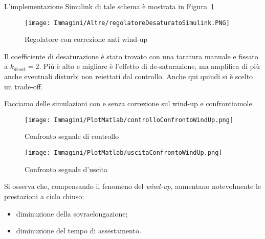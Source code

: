 \documentclass[a4paper,12pt]{article}
\begin{document}
\vspace{0.5cm}

L'implementazione Simulink di tale schema è mostrata in Figura~\ref{fig: regolatoreAntiWU}

\begin{figure}[h!]
    \centering
    \texttt{[image: Immagini/Altre/regolatoreDesaturatoSimulink.PNG]}
    \caption{Regolatore con correzione anti wind-up}
    \label{fig: regolatoreAntiWU}
\end{figure}

\vspace{0.5cm}

Il coefficiente di desaturazione è stato trovato con una taratura manuale e fissato a $k_{desat}=2$. Più è alto e migliore è l'effetto di de-saturazione, ma amplifica di più anche eventuali disturbi non reiettati dal controllo. Anche qui quindi si è scelto un trade-off.

\vspace{0.5cm}

Facciamo delle simulazioni con e senza correzione sul wind-up e confrontiamole.

\begin{figure}[h!]
    \centering
    \begin{minipage}{0.48\textwidth}
        \centering
        \texttt{[image: Immagini/PlotMatlab/controlloConfrontoWindUp.png]}
        \caption{Confronto segnale di controllo}
        \label{fig:controlloConfontoWU}
    \end{minipage}\hfill
    \begin{minipage}{0.48\textwidth}
        \centering
        \texttt{[image: Immagini/PlotMatlab/uscitaConfrontoWindUp.png]}
        \caption{Confronto segnale d'uscita}
        \label{fig:uscitaConfontoWU}
    \end{minipage}
\end{figure}

\vspace{0.5cm}

Si osserva che, compensando il fenomeno del \textit{wind-up}, aumentano notevolmente le prestazioni a ciclo chiuso:
\begin{itemize}
    \item diminuzione della sovraelongazione;
    \item diminuzione del tempo di assestamento.
\end{itemize}

\vspace{0.5cm}
\end{document}
